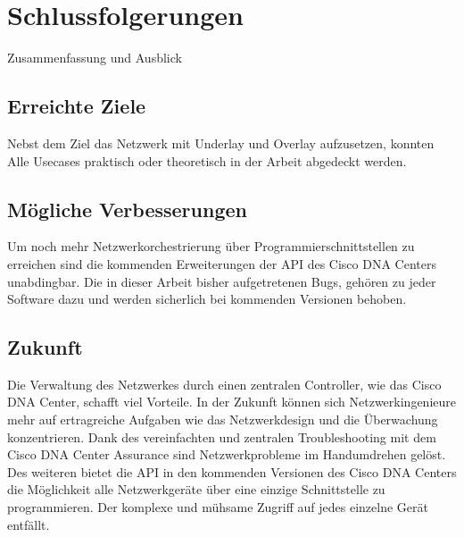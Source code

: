\section{Schlussfolgerungen}
Zusammenfassung und Ausblick
\subsection{Erreichte Ziele}
Nebst dem Ziel das Netzwerk mit Underlay und Overlay aufzusetzen, konnten Alle Usecases praktisch oder theoretisch in der Arbeit abgedeckt werden. 
\subsection{Mögliche Verbesserungen}
Um noch mehr Netzwerkorchestrierung über Programmierschnittstellen zu erreichen sind die kommenden Erweiterungen der API des Cisco DNA Centers unabdingbar. Die in dieser Arbeit bisher aufgetretenen Bugs, gehören zu jeder Software dazu und werden sicherlich bei kommenden Versionen behoben. 
 
\subsection{Zukunft}
Die Verwaltung des Netzwerkes durch einen zentralen Controller, wie das Cisco DNA Center, schafft viel Vorteile. In der Zukunft können sich Netzwerkingenieure mehr auf ertragreiche Aufgaben wie das Netzwerkdesign und die Überwachung konzentrieren. Dank des vereinfachten und zentralen Troubleshooting mit dem Cisco DNA Center Assurance sind Netzwerkprobleme im Handumdrehen gelöst. Des weiteren bietet die API in den kommenden Versionen des Cisco DNA Centers die Möglichkeit alle Netzwerkgeräte über eine einzige Schnittstelle zu programmieren. Der komplexe und mühsame Zugriff auf jedes einzelne Gerät entfällt. 